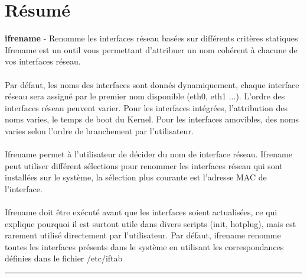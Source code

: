 

\section {Résumé}

\textbf{ifrename} - Renomme les interfaces réseau basées sur différents
critères statiques\\


Ifrename est un outil vous permettant d'attribuer un nom cohérent à chacune
de vos interfaces réseau.\\
\\
Par défaut, les noms des interfaces sont donnés dynamiquement, chaque interface
réseau sera assigné par le premier nom disponible (eth0, eth1 ...). L'ordre
des interfaces réseau peuvent varier. Pour les interfaces intégrées,
l'attribution des noms varies, le temps de boot du Kernel. Pour les interfaces
amovibles, des noms varies selon l'ordre de branchement par l'utilisateur.\\
\\
Ifrename permet à l'utilisateur de décider du nom de interface réseau. Ifrename
peut utiliser différent sélections pour renommer les interfaces réseau qui sont
installées sur le système, la sélection plus courante est l'adresse MAC de
l'interface.\\
\\
Ifrename doit être exécuté avant que les interfaces soient actualisées, ce qui
explique pourquoi il est surtout utile dans divers scripts (init, hotplug),
mais est rarement utilisé directement par l'utilisateur. Par défaut, ifrename
renomme toutes les interfaces présents dans le système en utilisant
les correspondances définies dans le fichier /etc/iftab\\

\vspace{15pt}
\hrule
{}

